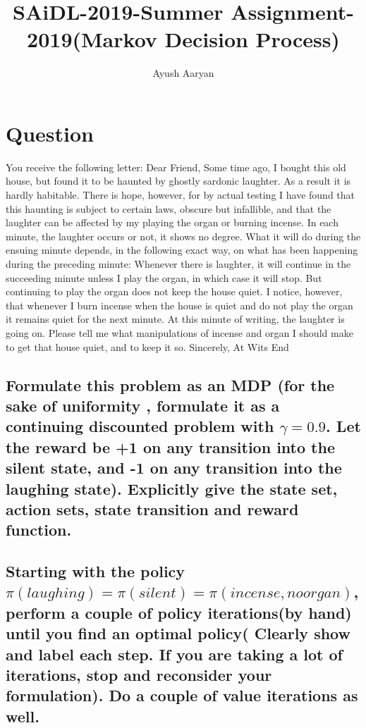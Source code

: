 \documentclass{article}
\title{SAiDL-2019-Summer Assignment-2019(Markov Decision Process)}
\author{Ayush Aaryan}
\begin{document}
\maketitle
{}
{}

\section{Question}


You receive the following letter:\newline
Dear Friend,
Some time ago, I bought this old house, but found it to be haunted by
ghostly sardonic laughter. As a result it is hardly habitable. There is hope,
however, for by actual testing I have found that this haunting is subject to
certain laws, obscure but infallible, and that the laughter can be affected by
my playing the organ or burning incense. In each minute, the laughter occurs
or not, it shows no degree. What it will do during the ensuing minute depends,
in the following exact way, on what has been happening during the preceding
minute: Whenever there is laughter, it will continue in
the succeeding minute unless I play the organ, in which case it will stop. But
continuing to play the organ does not keep the house quiet. I notice, however,
that whenever I burn incense when the house is quiet and do not play the
organ it remains quiet for the next minute. At this minute of writing, the
laughter is going on. Please tell me what manipulations of incense and organ
I should make to get that house quiet, and to keep it so.\newline
Sincerely,\newline
At Wits End

\subsection{Formulate this problem as an MDP (for the sake of uniformity , formulate it as
a continuing discounted problem with $\gamma=0.9$. Let the reward be +1 on any
transition into the silent state, and -1 on any transition into the laughing state).
Explicitly give the state set, action sets, state transition and reward function.}


\subsection{Starting with the policy $\pi(laughing)=\pi(silent)=\pi(incense, no organ)$,
perform a couple of policy iterations(by hand) until you find an optimal policy(
Clearly show and label each step. If you are taking a lot of iterations, stop and
reconsider your formulation). Do a couple of value iterations as well.
}
\end{document}

